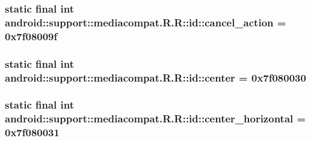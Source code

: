 \hypertarget{classandroid_1_1support_1_1mediacompat_1_1_r_1_1id_b704df462f5128b885e380d5966a57e4}{
\subsubsection[{cancel\_\-action}]{\setlength{\rightskip}{0pt plus 5cm}static final int android::support::mediacompat.R.R::id::cancel\_\-action = 0x7f08009f}}
\label{classandroid_1_1support_1_1mediacompat_1_1_r_1_1id_b704df462f5128b885e380d5966a57e4}


\hypertarget{classandroid_1_1support_1_1mediacompat_1_1_r_1_1id_5d8c4ba10ad0d9351558623e2e922a0d}{
\subsubsection[{center}]{\setlength{\rightskip}{0pt plus 5cm}static final int android::support::mediacompat.R.R::id::center = 0x7f080030}}
\label{classandroid_1_1support_1_1mediacompat_1_1_r_1_1id_5d8c4ba10ad0d9351558623e2e922a0d}


\hypertarget{classandroid_1_1support_1_1mediacompat_1_1_r_1_1id_6ee14bcebdcec35f8f87978edf58fde3}{
\subsubsection[{center\_\-horizontal}]{\setlength{\rightskip}{0pt plus 5cm}static final int android::support::mediacompat.R.R::id::center\_\-horizontal = 0x7f080031}}
\label{classandroid_1_1support_1_1mediacompat_1_1_r_1_1id_6ee14bcebdcec35f8f87978edf58fde3}


